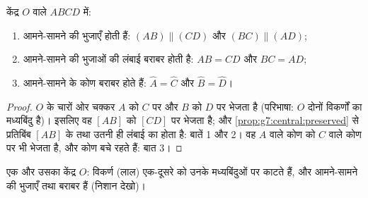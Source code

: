 \begin{theorem}[समांतर चतुर्भुज के गुण]\label{thm:g7:central:properties}
केंद्र $O$ वाले  $ABCD$ में:
\begin{enumerate}
  \item आमने-सामने की भुजाएँ  होती हैं:
        $(AB) \parallel (CD)$ और $(BC) \parallel (AD)$;
  \item आमने-सामने की भुजाओं की लंबाई बराबर होती है: $AB = CD$ और
        $BC = AD$;
  \item आमने-सामने के कोण बराबर होते हैं: $\widehat A = \widehat C$
        और $\widehat B = \widehat D$।
\end{enumerate}
\end{theorem}

\begin{proof}
$O$ के चारों ओर  चक्कर $A$ को $C$ पर और $B$ को $D$ पर भेजता है
(परिभाषा: $O$ दोनों विकर्णों का मध्यबिंदु है)। इसलिए वह 
$[AB]$ को  $[CD]$ पर भेजता है; और
\cref{prop:g7:central:preserved} से प्रतिबिंब $[AB]$ के  तथा
उतनी ही लंबाई का होता है: बातें 1 और 2। वह $A$ वाले कोण को $C$ वाले
कोण पर भी भेजता है, और कोण बचे रहते हैं: बात 3।
\end{proof}

\begin{omfigure}

{\small एक  और उसका केंद्र $O$: विकर्ण (लाल) एक-दूसरे
को उनके मध्यबिंदुओं पर काटते हैं, और आमने-सामने की भुजाएँ  तथा
बराबर हैं (निशान देखो)।}
\end{omfigure}

